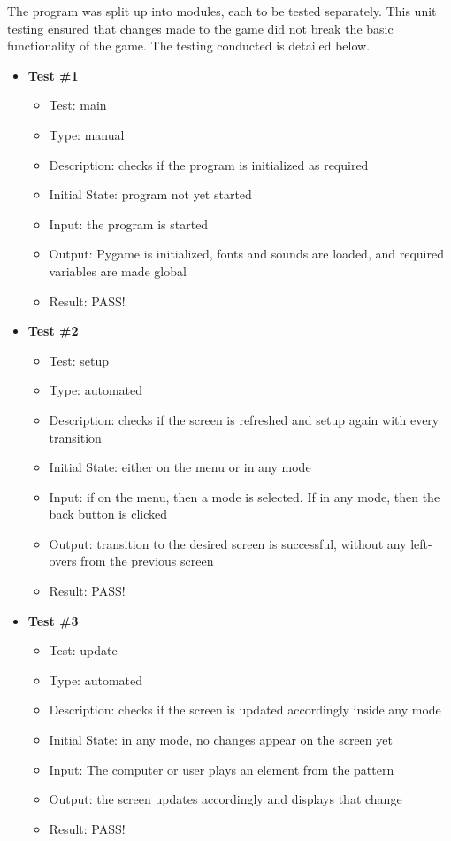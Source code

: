 \documentclass[12pt, titlepage]{article}
\begin{document}
\begin{itemize}
\par The program was split up into modules, each to be tested separately. This unit testing ensured that changes made to the game did not break the basic functionality of the game. The testing conducted is detailed below.

\begin{itemize}

\item \textbf {Test \#1}
\begin{itemize}
\item{Test: main}
\item{Type: manual}
\item{Description: checks if the program is initialized as required}
\item{Initial State: program not yet started}
\item{Input: the program is started}
\item{Output: Pygame is initialized, fonts and sounds are loaded, and required variables are made global}
\item{Result: PASS!}
\end{itemize}

\item \textbf {Test \#2}
\begin{itemize}
\item{Test: setup}
\item{Type: automated}
\item{Description: checks if the screen is refreshed and setup again with every transition}
\item{Initial State: either on the menu or in any mode}
\item{Input: if on the menu, then a mode is selected. If in any mode, then the back button is clicked}
\item{Output: transition to the desired screen is successful, without any left-overs from the previous screen}
\item{Result: PASS!}
\end{itemize}

\item \textbf {Test \#3}
\begin{itemize}
\item{Test: update}
\item{Type: automated}
\item{Description: checks if the screen is updated accordingly inside any mode}
\item{Initial State: in any mode, no changes appear on the screen yet}
\item{Input: The computer or user plays an element from the pattern}
\item{Output: the screen updates accordingly and displays that change}
\item{Result: PASS!}
\end{itemize}


\end{itemize}
\end{itemize}
\end{document}
